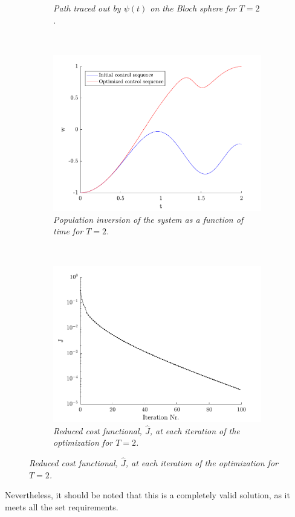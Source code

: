 \begin{figure}[h!]
\begin{subfigure}[t]{0.49\textwidth}
        \caption{\textit{Path traced out by $\psi (t)$ on the Bloch sphere for $T = 2$.}}
        \label{fig:path2}
    \end{subfigure}   
	~
    \begin{subfigure}[t]{0.49\textwidth}
        \includegraphics[width=\textwidth]{Figures/pop2.pdf}
        \caption{\textit{Population inversion of the system as a function of time for $T = 2$.}}
        \label{fig:population2}
    \end{subfigure}
    ~
    \begin{subfigure}[t]{0.49\textwidth}
        \includegraphics[width=\textwidth]{Figures/cost2.pdf}
        \caption{\textit{Reduced cost functional, $\hat{J}$, at each iteration of the optimization for $T = 2$.}}
        \label{fig:cost2}
    \end{subfigure}     
\end{figure}
Nevertheless, it should be noted that this is a completely valid solution, as it meets all the set requirements.